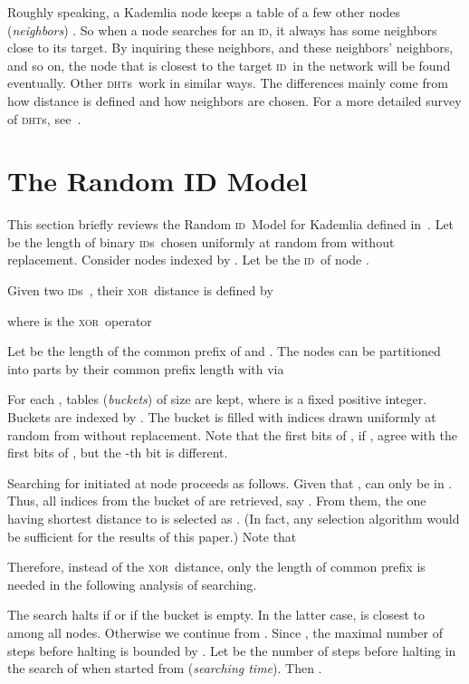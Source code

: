 \documentclass{article}
\newcommand{\dht}{{\scshape dht}}
\newcommand{\dhts}{{\dht s}}
\newcommand{\id}{{\scshape id}}
\newcommand{\ids}{{\id s}}
\newcommand{\xor}{{\scshape xor}}
\begin{document}
Roughly speaking, a Kademlia node keeps a table of a few other nodes
(\emph{neighbors}) .  So when a node
searches for an \id, it always has some neighbors close to its target.  By
inquiring these neighbors, and these neighbors' neighbors, and so on, the
node that is closest to the target \id\ in the network will be found
eventually. Other \dhts\ work in similar ways.  The differences mainly come
from how distance is defined and how neighbors are chosen. For a more detailed
survey of \dhts, see~\citep{Balakrishnan03}.

\section{The Random ID Model}

This section briefly reviews the Random \id\ Model for Kademlia defined
in~\citep{Cai2013}. Let  be the length of  binary \ids\
 chosen uniformly at random from  without
replacement. Consider  nodes indexed by . Let  be the
\id\ of node . 

Given two \ids\ , their \xor\ 
distance is defined by 

where  is the \xor\ operator


Let  be the length of the common prefix of  and . The 
nodes can be partitioned into  parts by their common prefix length with
 via

For each ,  tables (\emph{buckets}) of size   are
kept, where  is a fixed positive integer. Buckets are indexed by .  The bucket  is filled with  indices drawn
uniformly at random from  without replacement. Note that the first
 bits of , if , agree with the first  bits of
, but the -th bit is different.

Searching for  initiated at node  proceeds as follows. Given
that ,  can only be in . Thus, all indices from
the bucket  of  are retrieved, say . From them, the one
having shortest distance to  is selected as . (In fact, any selection
algorithm would be sufficient for the results of this paper.) Note that

Therefore, instead of the \xor\ distance, only the length of common prefix is
needed in the following analysis of searching.

The search halts if  or if the bucket is empty. In the latter case,
 is closest to  among all nodes. Otherwise we continue from .
Since , the maximal number of steps before
halting is bounded by .  Let  be the number of steps before halting in
the search of  when started from  (\emph{searching time}).  Then .
\end{document}
